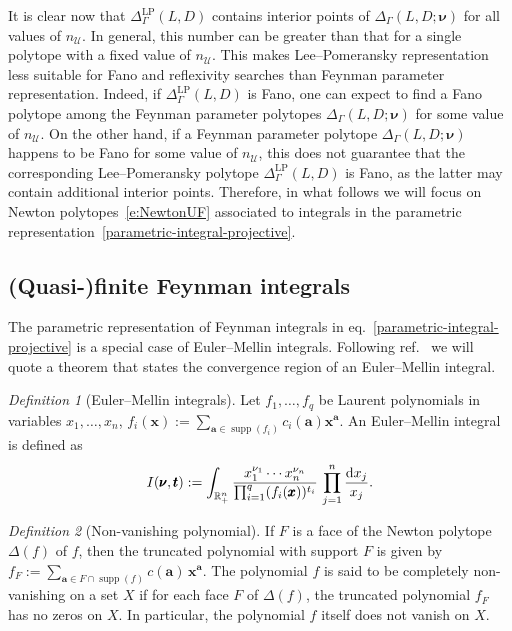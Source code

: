 \documentclass[12pt,a4paper]{article}
\theoremstyle{plain}
\theoremstyle{remark}
\newtheorem{defn}{Definition}[section]
\newcommand{\dd}{\mathrm{d}}
\newcommand{\cU}{\mathscr {U}}
\newcommand{\undernotation}[1]{\pmb{#1}}
\newcommand{\Newton}{\Delta}
\DeclareMathOperator{\supp}{supp}
\begin{document}
It is clear now that \(\Delta_\Gamma^{\mathrm{LP}}(L, D)\) contains
interior points of \(\Delta_\Gamma (L, D; \undernotation{\nu})\)  for
all values of \(n_\cU\). In general, this number can be greater than
that for a single polytope with a fixed value of \(n_\cU\). This makes
Lee--Pomeransky representation less suitable for Fano and reflexivity
searches than Feynman parameter representation. Indeed, if
\(\Delta_\Gamma^{\mathrm{LP}}(L, D)\) is Fano, one can expect to find
a Fano polytope among the Feynman parameter polytopes \(\Delta_\Gamma
(L, D; \undernotation{\nu})\) for some value of \(n_\cU\). On the
other hand, if a Feynman parameter polytope \(\Delta_\Gamma (L, D;
\undernotation{\nu})\) happens to be Fano for some value of \(n_\cU\),
this does not guarantee that the corresponding Lee--Pomeransky
polytope \(\Delta_\Gamma^{\mathrm{LP}}(L, D)\) is Fano, as the latter
may contain additional interior points. 
Therefore, in what follows we will focus on Newton polytopes~\eqref{e:NewtonUF} associated to integrals in the parametric representation~\eqref{parametric-integral-projective}.

		
		\subsection{(Quasi-)finite Feynman integrals}
		\label{quasifinite}	The parametric representation of Feynman integrals in
		eq.~\eqref{parametric-integral-projective}  is a special
		case of Euler--Mellin integrals. Following ref.~\cite{2011arXiv1103.6273B} we will quote a theorem that states the convergence region of an Euler--Mellin integral.
		
		\begin{defn}[Euler--Mellin integrals]
        Let $f_1, \dots, f_q$ be Laurent polynomials in variables $x_1,\dots,x_n$, $f_i(\undernotation x):=\sum_{\undernotation a \in
				\supp(f_i)} c_i(\undernotation a)  \undernotation
			x^{\undernotation a}$. An Euler--Mellin integral is defined
			as
			\begin{equation}\label{e:Mellin}
				I(\undernotation{\nu},\undernotation t):=    \int_{\mathbb R^n_+}  {x_1^{\nu_1} \cdots x_n^{\nu_n}\over \prod_{i=1}^q (f_i(\undernotation x))^{t_i}} \, \prod_{j=1}^n {\dd x_j\over x_j}.
			\end{equation}
		\end{defn}
		\begin{defn}[Non-vanishing polynomial]
			If $F$ is a face of the Newton polytope
			$\Newton(f)$ of $f$, then the truncated polynomial with
			support $F$ is given by $f_F:=\sum_{\undernotation a\in
				F \cap \supp(f)} c(\undernotation a)\, \undernotation
			x^{\undernotation a}$. The polynomial $f$ is said to be completely
			non-vanishing on a set $X$ if for each face $F$ of
			$\Newton(f)$, the truncated polynomial $f_F$ has no zeros
			on $X$. In particular, the polynomial $f$ itself does not
			vanish on $X$.  
		\end{defn}
		
\end{document}

